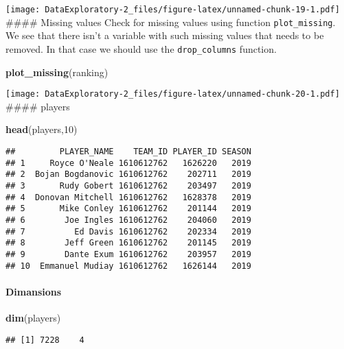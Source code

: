 \documentclass[
]{article}
\newenvironment{Shaded}{\begin{snugshade}}{\end{snugshade}}
\newcommand{\DecValTok}[1]{\textcolor[rgb]{0.00,0.00,0.81}{#1}}
\newcommand{\KeywordTok}[1]{\textcolor[rgb]{0.13,0.29,0.53}{\textbf{#1}}}
\newcommand{\NormalTok}[1]{#1}
\begin{document}
\texttt{[image: DataExploratory-2\_files/figure-latex/unnamed-chunk-19-1.pdf]}
\#\#\#\# Missing values Check for missing values using function
\texttt{plot\_missing}. We see that there isn't a variable with such
missing values that needs to be removed. In that case we should use the
\texttt{drop\_columns} function.

\begin{Shaded}
\begin{Highlighting}[]
\KeywordTok{plot\_missing}\NormalTok{(ranking)}
\end{Highlighting}
\end{Shaded}

\texttt{[image: DataExploratory-2\_files/figure-latex/unnamed-chunk-20-1.pdf]}
\#\#\#\# players

\begin{Shaded}
\begin{Highlighting}[]
\KeywordTok{head}\NormalTok{(players,}\DecValTok{10}\NormalTok{)}
\end{Highlighting}
\end{Shaded}

\begin{verbatim}
##         PLAYER_NAME    TEAM_ID PLAYER_ID SEASON
## 1     Royce O'Neale 1610612762   1626220   2019
## 2  Bojan Bogdanovic 1610612762    202711   2019
## 3       Rudy Gobert 1610612762    203497   2019
## 4  Donovan Mitchell 1610612762   1628378   2019
## 5       Mike Conley 1610612762    201144   2019
## 6        Joe Ingles 1610612762    204060   2019
## 7          Ed Davis 1610612762    202334   2019
## 8        Jeff Green 1610612762    201145   2019
## 9        Dante Exum 1610612762    203957   2019
## 10  Emmanuel Mudiay 1610612762   1626144   2019
\end{verbatim}

\hypertarget{dimansions}{%
\paragraph{Dimansions}\label{dimansions}}

\begin{Shaded}
\begin{Highlighting}[]
\KeywordTok{dim}\NormalTok{(players)}
\end{Highlighting}
\end{Shaded}

\begin{verbatim}
## [1] 7228    4
\end{verbatim}
\end{document}
